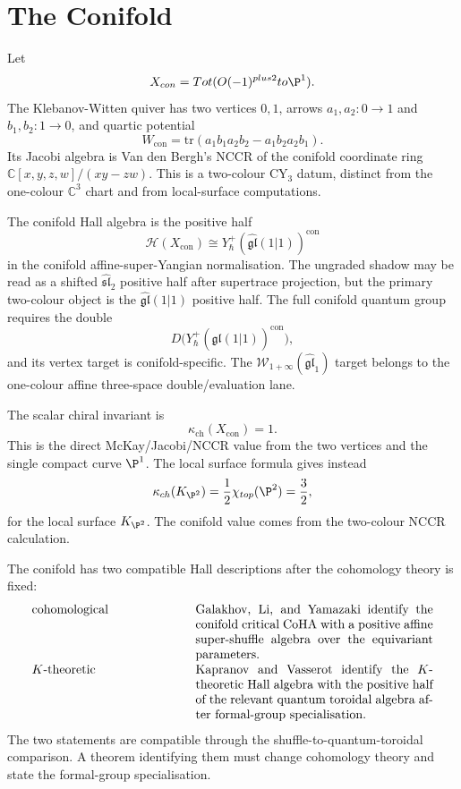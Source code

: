 \documentclass[11pt]{article}
\theoremstyle{definition}
\theoremstyle{remark}
\providecommand{\Winf}{\mathcal{W}_{1+\infty}}
\providecommand{\CC}{\mathbb{C}}
\providecommand{\gghone}{\widehat{\mathfrak{gl}}_1}
\providecommand{\cO}{\mathcal{O}}
\providecommand{\cH}{\mathcal{H}}
\providecommand{\kch}{\kappa_{\mathrm{ch}}}
\begin{document}
\section{The Conifold}
\label{sec:conifold}

Let
\[
 X_{\mathrm{con}}=\mathrm{Tot}(\cO(-1)^{\oplus 2}\to\P^1).
\]
The Klebanov-Witten quiver has two vertices $0,1$, arrows
$a_1,a_2:0\to1$ and $b_1,b_2:1\to0$, and quartic potential
\[
 W_{\mathrm{con}}=
 \mathrm{tr}(a_1b_1a_2b_2-a_1b_2a_2b_1).
\]
Its Jacobi algebra is Van den Bergh's NCCR of the conifold coordinate
ring $\CC[x,y,z,w]/(xy-zw)$. This is a two-colour CY$_3$ datum,
distinct from the one-colour $\CC^3$ chart and from local-surface
computations.

The conifold Hall algebra is the positive half
\[
 \cH(X_{\mathrm{con}})
 \cong Y^+_{\hbar}(\widehat{\mathfrak{gl}}(1|1))^{\mathrm{con}}
\]
in the conifold affine-super-Yangian normalisation. The ungraded shadow
may be read as a shifted $\widehat{\mathfrak{sl}}_2$ positive half after
supertrace projection, but the primary two-colour object is the
$\widehat{\mathfrak{gl}}(1|1)$ positive half. The full conifold quantum
group requires the double
\[
 D\bigl(Y^+_{\hbar}(\widehat{\mathfrak{gl}}(1|1))^{\mathrm{con}}\bigr),
\]
 and its vertex target is conifold-specific. The $\Winf(\gghone)$ target
belongs to the one-colour affine three-space double/evaluation lane.

The scalar chiral invariant is
\[
 \kch(X_{\mathrm{con}})=1.
\]
This is the direct McKay/Jacobi/NCCR value from the two vertices and the
single compact curve $\P^1$. The local surface formula gives instead
\[
 \kch(K_{\P^2})=\frac12\chi_{\mathrm{top}}(\P^2)=\frac32,
\]
for the local surface \(K_{\P^2}\).  The conifold value comes from the
two-colour NCCR calculation.

The conifold has two compatible Hall descriptions after the cohomology
theory is fixed:
\[
\begin{array}{p{0.35\textwidth}p{0.55\textwidth}}
\text{cohomological} &
Galakhov, Li, and Yamazaki identify the conifold critical CoHA with a
positive affine super-shuffle algebra over the equivariant parameters.\\[0.8ex]
\text{$K$-theoretic} &
Kapranov and Vasserot identify the $K$-theoretic Hall algebra with the
positive half of the relevant quantum toroidal algebra after
formal-group specialisation.
\end{array}
\]
The two statements are compatible through the shuffle-to-quantum-toroidal
comparison. A theorem identifying them must change cohomology theory and
state the formal-group specialisation.
\end{document}
